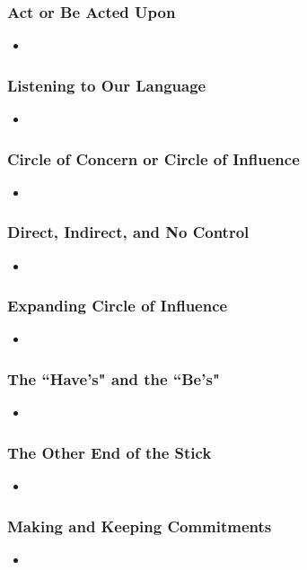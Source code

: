 \documentclass[11pt]{article}
\begin{document}
\subsubsection{Act or Be Acted Upon}
\begin{itemize}
\item 
\end{itemize}
\subsubsection{Listening to Our Language}
\begin{itemize}
\item 
\end{itemize}
\subsubsection{Circle of Concern or Circle of Influence}
\begin{itemize}
\item 
\end{itemize}
\subsubsection{Direct, Indirect, and No Control}
\begin{itemize}
\item 
\end{itemize}
\subsubsection{Expanding Circle of Influence}
\begin{itemize}
\item 
\end{itemize}
\subsubsection{The ``Have's" and the ``Be's"}
\begin{itemize}
\item 
\end{itemize}
\subsubsection{The Other End of the Stick}
\begin{itemize}
\item 
\end{itemize}
\subsubsection{Making and Keeping Commitments}
\begin{itemize}
\item 
\end{itemize}
\end{document}
